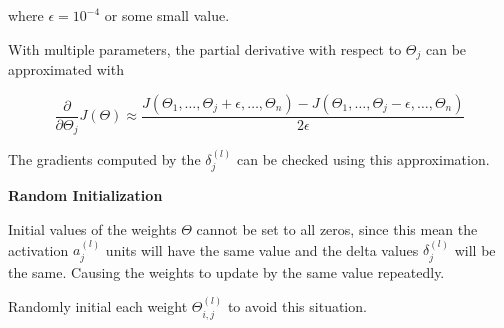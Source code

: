 \documentclass[
]{article}
\begin{document}
where \(\epsilon=10^{-4}\) or some small value.

With multiple parameters, the partial derivative with respect to
\(\Theta_j\) can be approximated with

\[\dfrac{\partial}{\partial\Theta_j}J(\Theta) \approx \dfrac{J(\Theta_1, \dots, \Theta_j + \epsilon, \dots, \Theta_n) - J(\Theta_1, \dots, \Theta_j - \epsilon, \dots, \Theta_n)}{2\epsilon}\]

The gradients computed by the \(\delta^{(l)}_j\) can be checked using
this approximation.

\textbf{Random Initialization}

Initial values of the weights \(\Theta\) cannot be set to all zeros,
since this mean the activation \(a^{(l)}_j\) units will have the same
value and the delta values \(\delta^{(l)}_j\) will be the same. Causing
the weights to update by the same value repeatedly.

Randomly initial each weight \(\Theta^{(l)}_{i,j}\) to avoid this
situation.
\end{document}
